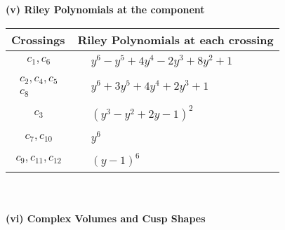 \documentclass[1p]{elsarticle_modified}
\theoremstyle{definition}
\begin{document}
\newpage\renewcommand{\arraystretch}{1}
\flushleft \textbf{(v) Riley Polynomials at the component}\newline \\
\begin{tabular}{m{50pt}|m{274pt}}
Crossings & \hspace{64pt}Riley Polynomials at each crossing \\
\hline $$\begin{aligned}c_{1},c_{6}\end{aligned}$$&$\begin{aligned}
&y^6- y^5+4 y^4-2 y^3+8 y^2+1
\end{aligned}$\\
\hline $$\begin{aligned}c_{2},c_{4},c_{5}\\c_{8}\end{aligned}$$&$\begin{aligned}
&y^6+3 y^5+4 y^4+2 y^3+1
\end{aligned}$\\
\hline $$\begin{aligned}c_{3}\end{aligned}$$&$\begin{aligned}
&(y^3- y^2+2 y-1)^2
\end{aligned}$\\
\hline $$\begin{aligned}c_{7},c_{10}\end{aligned}$$&$\begin{aligned}
&y^6
\end{aligned}$\\
\hline $$\begin{aligned}c_{9},c_{11},c_{12}\end{aligned}$$&$\begin{aligned}
&(y-1)^6
\end{aligned}$\\
\hline
\end{tabular}\\~\\
\newpage\flushleft \textbf{(vi) Complex Volumes and Cusp Shapes}
\end{document}
